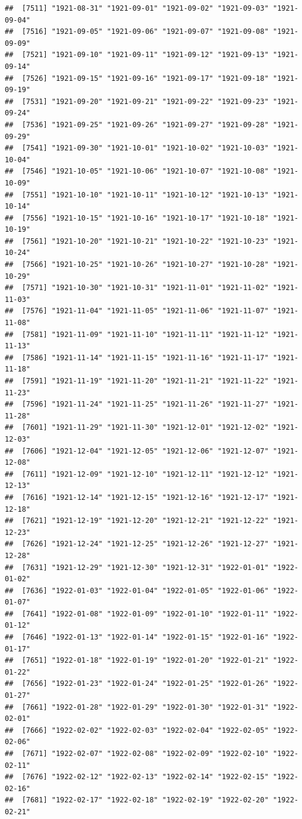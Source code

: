 \documentclass{article}\usepackage[]{graphicx}\usepackage[]{color}
\makeatletter
\newenvironment{kframe}{%
 \def\at@end@of@kframe{}%
 \ifinner\ifhmode%
  \def\at@end@of@kframe{\end{minipage}}%
  \begin{minipage}{\columnwidth}%
 \fi\fi%
 \def\FrameCommand##1{\hskip\@totalleftmargin \hskip-\fboxsep
 \colorbox{shadecolor}{##1}\hskip-\fboxsep
     \hskip-\linewidth \hskip-\@totalleftmargin \hskip\columnwidth}%
 \MakeFramed {\advance\hsize-\width
   \@totalleftmargin\z@ \linewidth\hsize
   \@setminipage}}%
 {\par\unskip\endMakeFramed%
 \at@end@of@kframe}
\newenvironment{knitrout}{}{} %
\makeatother
\begin{document}
\begin{description}
\begin{knitrout}
\begin{kframe}
\begin{verbatim}
##  [7511] "1921-08-31" "1921-09-01" "1921-09-02" "1921-09-03" "1921-09-04"
##  [7516] "1921-09-05" "1921-09-06" "1921-09-07" "1921-09-08" "1921-09-09"
##  [7521] "1921-09-10" "1921-09-11" "1921-09-12" "1921-09-13" "1921-09-14"
##  [7526] "1921-09-15" "1921-09-16" "1921-09-17" "1921-09-18" "1921-09-19"
##  [7531] "1921-09-20" "1921-09-21" "1921-09-22" "1921-09-23" "1921-09-24"
##  [7536] "1921-09-25" "1921-09-26" "1921-09-27" "1921-09-28" "1921-09-29"
##  [7541] "1921-09-30" "1921-10-01" "1921-10-02" "1921-10-03" "1921-10-04"
##  [7546] "1921-10-05" "1921-10-06" "1921-10-07" "1921-10-08" "1921-10-09"
##  [7551] "1921-10-10" "1921-10-11" "1921-10-12" "1921-10-13" "1921-10-14"
##  [7556] "1921-10-15" "1921-10-16" "1921-10-17" "1921-10-18" "1921-10-19"
##  [7561] "1921-10-20" "1921-10-21" "1921-10-22" "1921-10-23" "1921-10-24"
##  [7566] "1921-10-25" "1921-10-26" "1921-10-27" "1921-10-28" "1921-10-29"
##  [7571] "1921-10-30" "1921-10-31" "1921-11-01" "1921-11-02" "1921-11-03"
##  [7576] "1921-11-04" "1921-11-05" "1921-11-06" "1921-11-07" "1921-11-08"
##  [7581] "1921-11-09" "1921-11-10" "1921-11-11" "1921-11-12" "1921-11-13"
##  [7586] "1921-11-14" "1921-11-15" "1921-11-16" "1921-11-17" "1921-11-18"
##  [7591] "1921-11-19" "1921-11-20" "1921-11-21" "1921-11-22" "1921-11-23"
##  [7596] "1921-11-24" "1921-11-25" "1921-11-26" "1921-11-27" "1921-11-28"
##  [7601] "1921-11-29" "1921-11-30" "1921-12-01" "1921-12-02" "1921-12-03"
##  [7606] "1921-12-04" "1921-12-05" "1921-12-06" "1921-12-07" "1921-12-08"
##  [7611] "1921-12-09" "1921-12-10" "1921-12-11" "1921-12-12" "1921-12-13"
##  [7616] "1921-12-14" "1921-12-15" "1921-12-16" "1921-12-17" "1921-12-18"
##  [7621] "1921-12-19" "1921-12-20" "1921-12-21" "1921-12-22" "1921-12-23"
##  [7626] "1921-12-24" "1921-12-25" "1921-12-26" "1921-12-27" "1921-12-28"
##  [7631] "1921-12-29" "1921-12-30" "1921-12-31" "1922-01-01" "1922-01-02"
##  [7636] "1922-01-03" "1922-01-04" "1922-01-05" "1922-01-06" "1922-01-07"
##  [7641] "1922-01-08" "1922-01-09" "1922-01-10" "1922-01-11" "1922-01-12"
##  [7646] "1922-01-13" "1922-01-14" "1922-01-15" "1922-01-16" "1922-01-17"
##  [7651] "1922-01-18" "1922-01-19" "1922-01-20" "1922-01-21" "1922-01-22"
##  [7656] "1922-01-23" "1922-01-24" "1922-01-25" "1922-01-26" "1922-01-27"
##  [7661] "1922-01-28" "1922-01-29" "1922-01-30" "1922-01-31" "1922-02-01"
##  [7666] "1922-02-02" "1922-02-03" "1922-02-04" "1922-02-05" "1922-02-06"
##  [7671] "1922-02-07" "1922-02-08" "1922-02-09" "1922-02-10" "1922-02-11"
##  [7676] "1922-02-12" "1922-02-13" "1922-02-14" "1922-02-15" "1922-02-16"
##  [7681] "1922-02-17" "1922-02-18" "1922-02-19" "1922-02-20" "1922-02-21"

\end{verbatim}
\end{kframe}
\end{knitrout}
\end{description}
\end{document}
